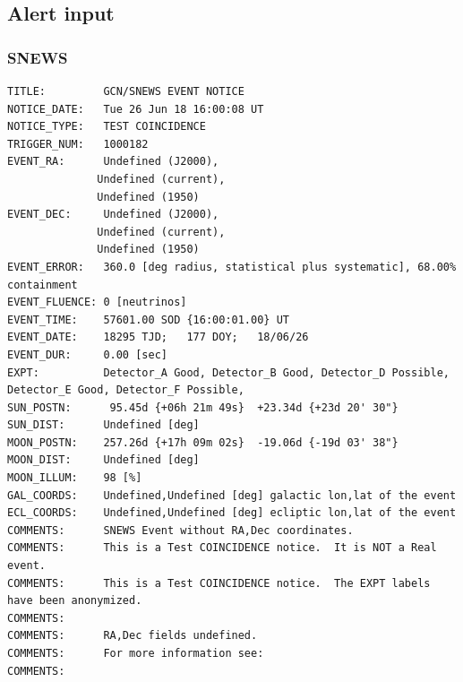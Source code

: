 \documentclass[11pt]{article}
\begin{document}
\subsection{Alert input}

\subsubsection{SNEWS}

\begin{verbatim}
TITLE:         GCN/SNEWS EVENT NOTICE
NOTICE_DATE:   Tue 26 Jun 18 16:00:08 UT
NOTICE_TYPE:   TEST COINCIDENCE
TRIGGER_NUM:   1000182
EVENT_RA:      Undefined (J2000),
              Undefined (current),
              Undefined (1950)
EVENT_DEC:     Undefined (J2000),
              Undefined (current),
              Undefined (1950)
EVENT_ERROR:   360.0 [deg radius, statistical plus systematic], 68.00% containment
EVENT_FLUENCE: 0 [neutrinos]
EVENT_TIME:    57601.00 SOD {16:00:01.00} UT
EVENT_DATE:    18295 TJD;   177 DOY;   18/06/26
EVENT_DUR:     0.00 [sec]
EXPT:          Detector_A Good, Detector_B Good, Detector_D Possible, Detector_E Good, Detector_F Possible, 
SUN_POSTN:      95.45d {+06h 21m 49s}  +23.34d {+23d 20' 30"}
SUN_DIST:      Undefined [deg]
MOON_POSTN:    257.26d {+17h 09m 02s}  -19.06d {-19d 03' 38"}
MOON_DIST:     Undefined [deg]
MOON_ILLUM:    98 [%]
GAL_COORDS:    Undefined,Undefined [deg] galactic lon,lat of the event
ECL_COORDS:    Undefined,Undefined [deg] ecliptic lon,lat of the event
COMMENTS:      SNEWS Event without RA,Dec coordinates.  
COMMENTS:      This is a Test COINCIDENCE notice.  It is NOT a Real event.  
COMMENTS:      This is a Test COINCIDENCE notice.  The EXPT labels have been anonymized.  
COMMENTS:         
COMMENTS:      RA,Dec fields undefined.  
COMMENTS:      For more information see:  
COMMENTS:
\end{verbatim}

\end{document}
